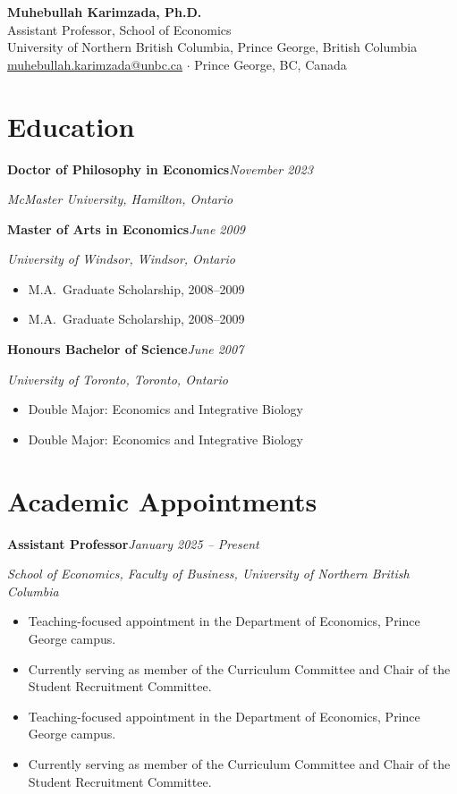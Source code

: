 \documentclass[11pt,letterpaper]{article}
\newcommand{\cventry}[4]{%
  \noindent\textbf{#2}\hfill\textit{\small #1}\par
  \noindent\textit{#3}\par
  \ifx\relax#4\relax\else
    \vspace{1pt}%
    #4%
  \fi
  \vspace{5pt}%
}
\begin{document}
\thispagestyle{empty}

\begin{center}
  {\LARGE\bfseries\color{navyblue} Muhebullah Karimzada, Ph.D.}\\[4pt]
  {\normalsize Assistant Professor, School of Economics}\\[2pt]
  {\normalsize University of Northern British Columbia, Prince George, British Columbia}\\[6pt]
  \small
  \href{mailto:muhebullah.karimzada@unbc.ca}{muhebullah.karimzada@unbc.ca}
  \quad $\cdot$ \quad
  Prince George, BC, Canada
\end{center}

\vspace{2pt}
\noindent{\color{navyblue}\rule{\textwidth}{0.8pt}}
\vspace{6pt}


\section{Education}

\cventry{November 2023}{Doctor of Philosophy in Economics}{McMaster University, Hamilton, Ontario}{}

\cventry{June 2009}{Master of Arts in Economics}{University of Windsor, Windsor, Ontario}{%
  \begin{itemize}
    \item M.A.\ Graduate Scholarship, 2008–2009
  \end{itemize}
}

\cventry{June 2007}{Honours Bachelor of Science}{University of Toronto, Toronto, Ontario}{%
  \begin{itemize}
    \item Double Major: Economics and Integrative Biology
  \end{itemize}
}

\section{Academic Appointments}

\cventry{January 2025 -- Present}{Assistant Professor}{School of Economics, Faculty of Business, University of Northern British Columbia}{%
  \begin{itemize}
    \item Teaching-focused appointment in the Department of Economics, Prince George campus.
    \item Currently serving as member of the Curriculum Committee and Chair of the Student Recruitment Committee.
  \end{itemize}
}
\end{document}
